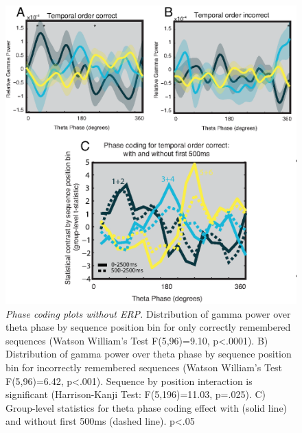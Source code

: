 \begin{figure}
  \centering
  \includegraphics[width=\textwidth]{figures/chapter3_suppfigure10.eps}
  \caption[Phase coding plots without ERP]{\textit{Phase coding plots without ERP.}  Distribution of gamma power over theta phase by sequence position bin for only correctly remembered sequences (Watson William’s Test F(5,96)=9.10, p<.0001). B) Distribution of gamma power over theta phase by sequence position bin for incorrectly remembered sequences (Watson William’s Test F(5,96)=6.42, p<.001). Sequence by position interaction is significant (Harrison-Kanji Test: F(5,196)=11.03, p=.025). C) Group-level statistics for theta phase coding effect with (solid line) and without first 500ms (dashed line). p<.05}
  \label{chapter3_suppfigure10}
\end{figure}

